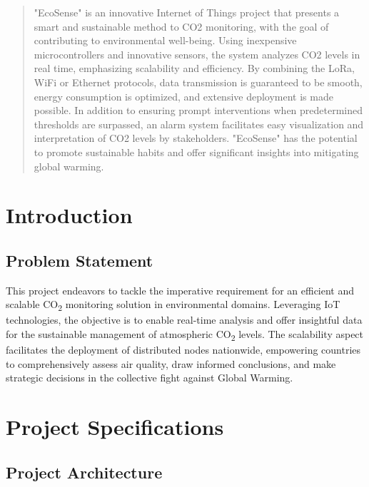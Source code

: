 \documentclass[conference]{IEEEtran}
\begin{document}
\maketitle

\begin{abstract}
"EcoSense" is an innovative Internet of Things project that presents a smart and sustainable method to CO2 monitoring, with the goal of contributing to environmental well-being. Using inexpensive microcontrollers and innovative sensors, the system analyzes CO2 levels in real time, emphasizing scalability and efficiency. By combining the LoRa, WiFi or Ethernet protocols, data transmission is guaranteed to be smooth, energy consumption is optimized, and extensive deployment is made possible. In addition to ensuring prompt interventions when predetermined thresholds are surpassed, an alarm system facilitates easy visualization and interpretation of CO2 levels by stakeholders. "EcoSense" has the potential to promote sustainable habits and offer significant insights into mitigating global warming.
\end{abstract}

\IEEEpeerreviewmaketitle

\section{Introduction}

\subsection{Problem Statement}
This project endeavors to tackle the imperative requirement for an efficient and scalable CO\textsubscript{2} monitoring solution in environmental domains. Leveraging IoT technologies, the objective is to enable real-time analysis and offer insightful data for the sustainable management of atmospheric CO\textsubscript{2} levels. The scalability aspect facilitates the deployment of distributed nodes nationwide, empowering countries to comprehensively assess air quality, draw informed conclusions, and make strategic decisions in the collective fight against Global Warming.

\section{Project Specifications}

\subsection{Project Architecture}
\end{document}
